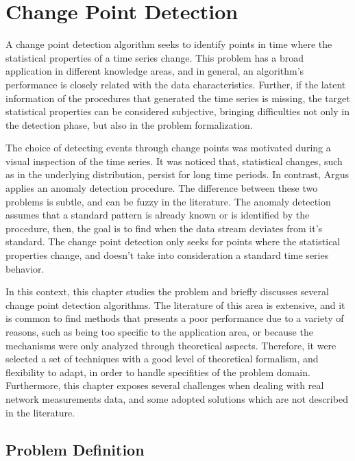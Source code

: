\chapter{Change Point Detection}
\label{chap:change_point_detection}

A change point detection algorithm seeks to identify points in time where the
statistical properties of a time series change. This problem has a broad
application in different knowledge areas, and in general, an algorithm's
performance is closely related with the data characteristics.
Further, if the latent information of the procedures that generated the time
series is missing, the target statistical properties can be considered
subjective, bringing difficulties not only in the detection phase, but also in
the problem formalization.

The choice of detecting events through change points was motivated during a
visual inspection of the time series.
It was noticed that, statistical changes, such as in the underlying
distribution, persist for long time periods.
In contrast, Argus applies an anomaly detection procedure.
The difference between
these two problems is subtle, and can be fuzzy in the literature. The
anomaly detection assumes that a standard pattern is already known or
is identified by the procedure, then, the goal is to find when the data
stream
deviates from it's standard. The change point detection only seeks for
points where the statistical properties change, and doesn't take into
consideration a standard time series behavior.

In this context, this chapter studies the problem and briefly discusses
several change point detection algorithms. The literature of this area is
extensive, and it is common to find methods that presents a poor performance
due to a variety of reasons, such as being too specific to the application
area, or because the mechanisms were only analyzed through theoretical
aspects. Therefore, it were selected a set of techniques with a good level
of theoretical formalism, and flexibility to adapt, in order to handle
specifities of the problem domain. Furthermore, this chapter exposes several
challenges when dealing with real network measurements data,
and some adopted solutions which are not described in the literature.

\section{Problem Definition}

